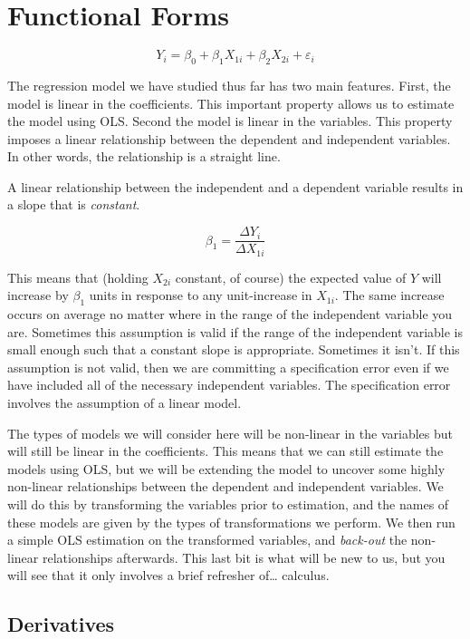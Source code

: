 \documentclass[
]{book}
\begin{document}
\hypertarget{FF}{%
\chapter{Functional Forms}\label{FF}}

\[Y_i = \beta_0 + \beta_1 X_{1i} + \beta_2 X_{2i} + \varepsilon_i\]

The regression model we have studied thus far has two main features. First, the model is linear in the coefficients. This important property allows us to estimate the model using OLS. Second the model is linear in the variables. This property imposes a linear relationship between the dependent and independent variables. In other words, the relationship is a straight line.

A linear relationship between the independent and a dependent variable results in a slope that is \emph{constant}.

\[\beta_1 = \frac{\Delta Y_i}{\Delta X_{1i}}\]

This means that (holding \(X_{2i}\) constant, of course) the expected value of \(Y\) will increase by \(\beta_1\) units in response to any unit-increase in \(X_{1i}\). The same increase occurs on average no matter where in the range of the independent variable you are. Sometimes this assumption is valid if the range of the independent variable is small enough such that a constant slope is appropriate. Sometimes it isn't. If this assumption is not valid, then we are committing a specification error even if we have included all of the necessary independent variables. The specification error involves the assumption of a linear model.

The types of models we will consider here will be non-linear in the variables but will still be linear in the coefficients. This means that we can still estimate the models using OLS, but we will be extending the model to uncover some highly non-linear relationships between the dependent and independent variables. We will do this by transforming the variables prior to estimation, and the names of these models are given by the types of transformations we perform. We then run a simple OLS estimation on the transformed variables, and \emph{back-out} the non-linear relationships afterwards. This last bit is what will be new to us, but you will see that it only involves a brief refresher of\ldots{} calculus.

\hypertarget{derivatives}{%
\section{Derivatives}\label{derivatives}}
\end{document}
